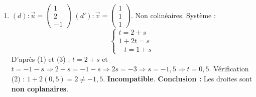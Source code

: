 \documentclass[11pt]{article}
\begin{document}
\begin{corrige}
\begin{enumerate}
\item $(d) : \vec{u}=\begin{pmatrix}1 \\ 2 \\ -1\end{pmatrix}$ \quad $(d') : \vec{v}=\begin{pmatrix}1 \\ 1 \\ 1\end{pmatrix}$.
Non colinéaires.
Système :
\[
\begin{cases}
t = 2+s \\
1+2t = s \\
-t = 1+s
\end{cases}
\]
D'après (1) et (3) : $t = 2+s$ et $t = -1-s \Rightarrow 2+s = -1-s \Rightarrow 2s = -3 \Rightarrow s = -1,5 \Rightarrow t = 0,5$.
Vérification (2) : $1+2(0,5) = 2 \neq -1,5$. \textbf{Incompatible}.
\textbf{Conclusion :} Les droites sont \textbf{non coplanaires}.
\end{enumerate}
\end{corrige}
\end{document}
